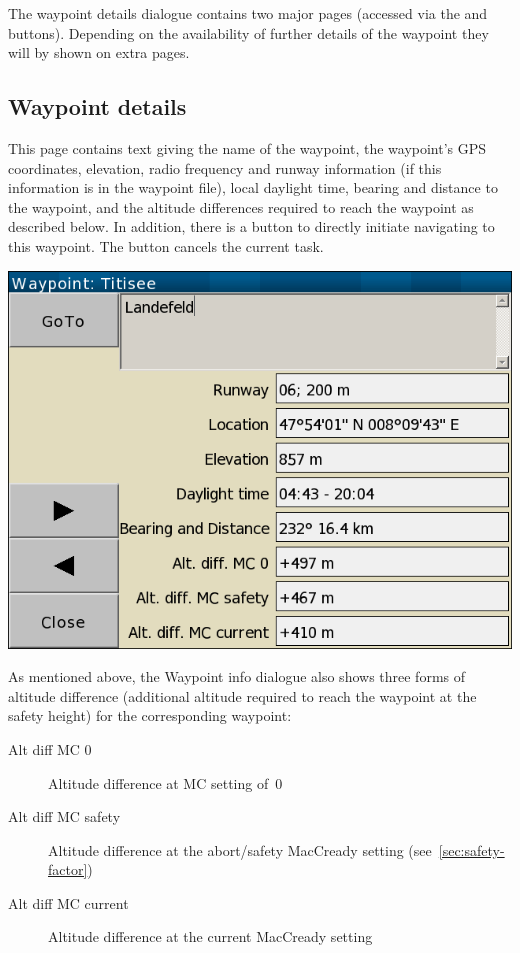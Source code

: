The waypoint details dialogue contains two major pages (accessed via the
\bmenuw{$>$} and \bmenuw{$<$} buttons). Depending on the availability of further
details of the waypoint they will by shown on extra pages.

\subsection*{Waypoint details}\label{sec:waypointdetails}
This page contains text giving the name of the waypoint,
the waypoint's GPS coordinates, elevation, radio frequency and 
runway information (if this information is in the waypoint file), 
local daylight time, bearing and distance to the waypoint, and the altitude 
differences required 
to reach the waypoint as described below. In addition, there is a button 
 to directly initiate
navigating to this waypoint. The button cancels the current task. 
\begin{center}
\includegraphics[angle=0,width=0.8\linewidth,keepaspectratio='true']{figures/dialog-waypointdetails0.png}
\end{center}

As mentioned above, the Waypoint info dialogue also shows three forms of altitude 
difference (additional
altitude required to reach the waypoint at the safety height) for
the corresponding waypoint:
\begin{description}
\item[Alt diff MC 0] Altitude difference at MC setting of~0
\item[Alt diff MC safety] Altitude difference at the abort/safety MacCready 
  setting (see~\ref{sec:safety-factor})
\item[Alt diff MC current] Altitude difference at the current MacCready setting
\end{description}

